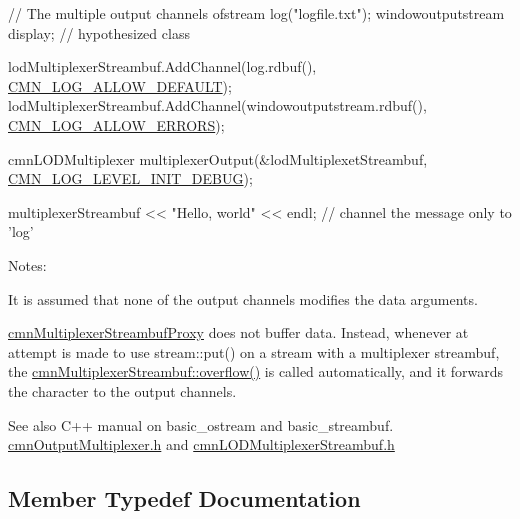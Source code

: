\begin{DoxyCode}
\textcolor{comment}{// The multiple output channels}
ofstream log(\textcolor{stringliteral}{"logfile.txt"});
windowoutputstream display;    \textcolor{comment}{// hypothesized class}

lodMultiplexerStreambuf.AddChannel(log.rdbuf(), \hyperlink{cmn_log_lo_d_8h_a941e5ff3075571f0ad1e53e1204bd856}{CMN\_LOG\_ALLOW\_DEFAULT});
lodMultiplexerStreambuf.AddChannel(windowoutputstream.rdbuf(), 
      \hyperlink{cmn_log_lo_d_8h_ab7e55f4e2a66d48b58961a862ba40cc2}{CMN\_LOG\_ALLOW\_ERRORS});

cmnLODMultiplexer multiplexerOutput(&lodMultiplexetStreambuf, 
      \hyperlink{cmn_log_lo_d_8h_a27e55e3638c78366331ee3c1ca3d60ef}{CMN\_LOG\_LEVEL\_INIT\_DEBUG});

multiplexerStreambuf << \textcolor{stringliteral}{"Hello, world"} << endl;  \textcolor{comment}{// channel the message only to 'log'}
\end{DoxyCode}


Notes\+:
\begin{DoxyEnumerate}
\item It is assumed that none of the output channels modifies the data arguments.
\item \hyperlink{classcmn_multiplexer_streambuf_proxy}{cmn\+Multiplexer\+Streambuf\+Proxy} does not buffer data. Instead, whenever at attempt is made to use stream\+::put() on a stream with a multiplexer streambuf, the \hyperlink{classcmn_multiplexer_streambuf_a90999d31356176b52174452e2a43c1ae}{cmn\+Multiplexer\+Streambuf\+::overflow()} is called automatically, and it forwards the character to the output channels.
\end{DoxyEnumerate}

\begin{DoxySeeAlso}{See also}
C++ manual on basic\+\_\+ostream and basic\+\_\+streambuf. \hyperlink{cmn_output_multiplexer_8h}{cmn\+Output\+Multiplexer.\+h} and \hyperlink{cmn_l_o_d_multiplexer_streambuf_8h}{cmn\+L\+O\+D\+Multiplexer\+Streambuf.\+h} 
\end{DoxySeeAlso}


\subsection{Member Typedef Documentation}
\hypertarget{classcmn_multiplexer_streambuf_proxy_aad26781c796870ad583a690f1d4132bb}{}
